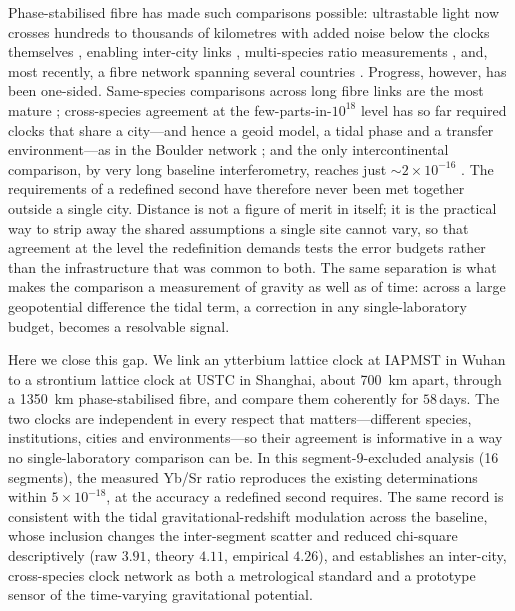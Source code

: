 \documentclass[11pt,a4paper]{article}
\begin{document}
Phase-stabilised fibre has made such comparisons possible: ultrastable
light now crosses hundreds to thousands of kilometres with added noise
below the clocks themselves \citep{schioppo2022cavities,
chen2026dissemination}, enabling inter-city links
\citep{lisdat2016network}, multi-species ratio measurements
\citep{beloy2021bacon}, and, most recently, a fibre network spanning
several countries \citep{pizzocaro2026european}. Progress, however, has
been one-sided. Same-species comparisons across long fibre links are the
most mature \citep{lisdat2016network, lindvall2025coordinated,
pizzocaro2026european}; cross-species agreement at the
few-parts-in-$10^{18}$ level has so far required clocks that share a
city---and hence a geoid model, a tidal phase and a transfer
environment---as in the Boulder network \citep{beloy2021bacon,
aeppli2026nist}; and the only intercontinental comparison, by very long
baseline interferometry, reaches just $\sim2\times10^{-16}$
\citep{pizzocaro2021vlbi}. The requirements of a redefined second have
therefore never been met together outside a single city. Distance is not
a figure of merit in itself; it is the practical way to strip away the
shared assumptions a single site cannot vary, so that agreement at the
level the redefinition demands tests the error budgets rather than the
infrastructure that was common to both. The same separation is what makes
the comparison a measurement of gravity as well as of time: across a
large geopotential difference the tidal term, a correction in any
single-laboratory budget, becomes a resolvable signal.

Here we close this gap. We link an ytterbium lattice clock at IAPMST in
Wuhan to a strontium lattice clock at USTC in Shanghai, about
\qty{700}{km} apart, through a \qty{1350}{km} phase-stabilised fibre, and
compare them coherently for $58$\,days. The two clocks are independent in
every respect that matters---different species, institutions, cities and
environments---so their agreement is informative in a way no
single-laboratory comparison can be. In this segment-9-excluded analysis
(16 segments), the measured Yb/Sr ratio reproduces the existing
determinations within $5\times10^{-18}$, at the accuracy a redefined
second requires. The same record is consistent with the tidal
gravitational-redshift modulation across the baseline, whose inclusion
changes the inter-segment scatter and reduced chi-square descriptively
(raw $3.91$, theory $4.11$, empirical $4.26$), and establishes an
inter-city, cross-species clock network as both a metrological standard
and a prototype sensor of the time-varying gravitational potential.
\end{document}
